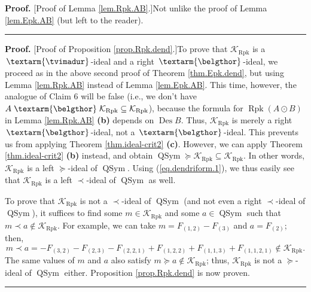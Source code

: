 \documentclass[numbers=enddot,12pt,final,onecolumn,notitlepage]{scrartcl}%
\theoremstyle{definition}
\newenvironment{proof}[1][Proof]{\noindent\textbf{#1.} }{\ \rule{0.5em}{0.5em}}
\newenvironment{verlong}{}{}
\newcommand{\tvi}{\left. \textarm{\tvimadur} \right.}
\newcommand{\bel}{\left. \textarm{\belgthor} \right.}
\begin{document}
\begin{verlong}
\begin{proof}
[Proof of Lemma \ref{lem.Rpk.AB}.]Not unlike the proof of Lemma
\ref{lem.Epk.AB} (but left to the reader).
\end{proof}

\begin{proof}
[Proof of Proposition \ref{prop.Rpk.dend}.]To prove that $\mathcal{K}%
_{\operatorname*{Rpk}}$ is a $\tvi$-ideal and a right $\bel$-ideal, we proceed
as in the above second proof of Theorem \ref{thm.Epk.dend}, but using Lemma
\ref{lem.Rpk.AB} instead of Lemma \ref{lem.Epk.AB}. This time, however, the
analogue of Claim 6 will be false (i.e., we don't have $A\bel\mathcal{K}%
_{\operatorname*{Rpk}}\subseteq\mathcal{K}_{\operatorname*{Rpk}}$), because
the formula for $\operatorname*{Rpk}\left(  A\odot B\right)  $ in Lemma
\ref{lem.Rpk.AB} \textbf{(b)} depends on $\operatorname{Des}B$. Thus,
$\mathcal{K}_{\operatorname*{Rpk}}$ is merely a right $\bel$-ideal, not a
$\bel$-ideal. This prevents us from applying Theorem \ref{thm.ideal-crit2}
\textbf{(c)}. However, we can apply Theorem \ref{thm.ideal-crit2} \textbf{(b)}
instead, and obtain $\operatorname*{QSym}\left.  \succeq\right.
\mathcal{K}_{\operatorname*{Rpk}}\subseteq\mathcal{K}_{\operatorname*{Rpk}}$.
In other words, $\mathcal{K}_{\operatorname*{Rpk}}$ is a left $\left.
\succeq\right.  $-ideal of $\operatorname*{QSym}$. Using
(\ref{eq.dendriform.1}), we thus easily see that $\mathcal{K}%
_{\operatorname*{Rpk}}$ is a left $\left.  \prec\right.  $-ideal of
$\operatorname*{QSym}$ as well.

To prove that $\mathcal{K}_{\operatorname*{Rpk}}$ is not a $\left.
\prec\right.  $-ideal of $\operatorname*{QSym}$ (and not even a right $\left.
\prec\right.  $-ideal of $\operatorname*{QSym}$), it suffices to find some
$m\in\mathcal{K}_{\operatorname*{Rpk}}$ and some $a\in\operatorname*{QSym}$
such that $m\left.  \prec\right.  a\notin\mathcal{K}_{\operatorname*{Rpk}}$.
For example, we can take $m=F_{\left(  1,2\right)  }-F_{\left(  3\right)  }$
and $a=F_{\left(  2\right)  }$; then,
\[
m\left.  \prec\right.  a=-F_{\left(  3,2\right)  }-F_{\left(  2,3\right)
}-F_{\left(  2,2,1\right)  }+F_{\left(  1,2,2\right)  }+F_{\left(
1,1,3\right)  }+F_{\left(  1,1,2,1\right)  }\notin\mathcal{K}%
_{\operatorname*{Rpk}}.
\]
The same values of $m$ and $a$ also satisfy $m\left.  \succeq\right.
a\notin\mathcal{K}_{\operatorname*{Rpk}}$; thus, $\mathcal{K}%
_{\operatorname*{Rpk}}$ is not a $\left.  \succeq\right.  $-ideal of
$\operatorname*{QSym}$ either. Proposition \ref{prop.Rpk.dend} is now proven.
\end{proof}


\end{verlong}
\end{document}
